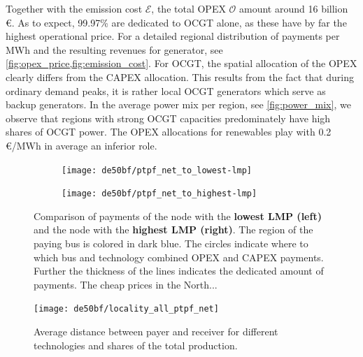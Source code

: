 \documentclass[11pt,twocolumn]{article}
\newcommand{\opex}{\mathcal{O}}
\newcommand{\emissioncost}{\mathcal{E}}
\begin{document}
Together with the emission cost $\emissioncost$, the total OPEX $\opex$ amount around 16 billion \euro. As to expect, 99.97\% are dedicated to OCGT alone, as these have by far the highest operational price. For a detailed regional distribution of payments per MWh and the resulting revenues for generator, see \cref{fig:opex_price,fig:emission_cost}. For OCGT, the spatial allocation of the OPEX clearly differs from  the CAPEX allocation. This results from the fact that during ordinary demand peaks, it is rather local OCGT generators which serve as backup generators. In the average power mix per region, see \cref{fig:power_mix}, we observe that regions with strong OCGT capacities predominately have high shares of OCGT power. The OPEX allocations for renewables play with 0.2 \euro/MWh in average an inferior role. \\

\begin{figure}
    \centering
    \begin{subfigure}[c]{.6\linewidth}
    \texttt{[image: de50bf/ptpf\_net\_to\_lowest-lmp]}
    \end{subfigure}
    \hspace{-.2151\linewidth}
    \begin{subfigure}[c]{.6\linewidth}
    \texttt{[image: de50bf/ptpf\_net\_to\_highest-lmp]}
    \end{subfigure}
    \caption{Comparison of payments of the node with the \textbf{lowest LMP (left)} and the node with the \textbf{highest LMP (right)}. The region of the paying bus is colored in dark blue. The circles indicate where to which bus and technology combined OPEX and CAPEX payments. Further the thickness of the lines indicates the dedicated amount of payments. The cheap prices in the North...  }
    \label{fig:direct-allocation}
\end{figure}


\begin{figure}
    \centering
    \texttt{[image: de50bf/locality\_all\_ptpf\_net]}
    \caption{Average distance between payer and receiver for different technologies and shares of the total production.}
    \label{fig:locality}
\end{figure}
\end{document}
